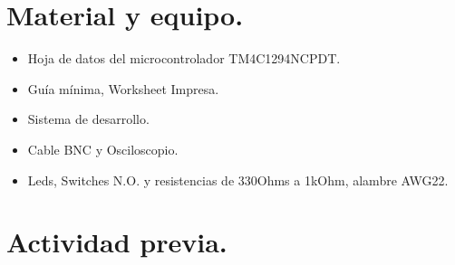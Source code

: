 \documentclass[a4paper,11pt]{article}                 %
\begin{document}
\section{Material y equipo.}
 
\begin{itemize}
	\item Hoja de datos del microcontrolador TM4C1294NCPDT. 
	\item Guía mínima, Worksheet Impresa. 
	\item Sistema de desarrollo. 
	\item Cable BNC y Osciloscopio. 
	\item Leds, Switches N.O. y resistencias de 330Ohms a 1kOhm, alambre AWG22.  
\end{itemize}
  

  
\section{Actividad previa.}                   
\end{document}
